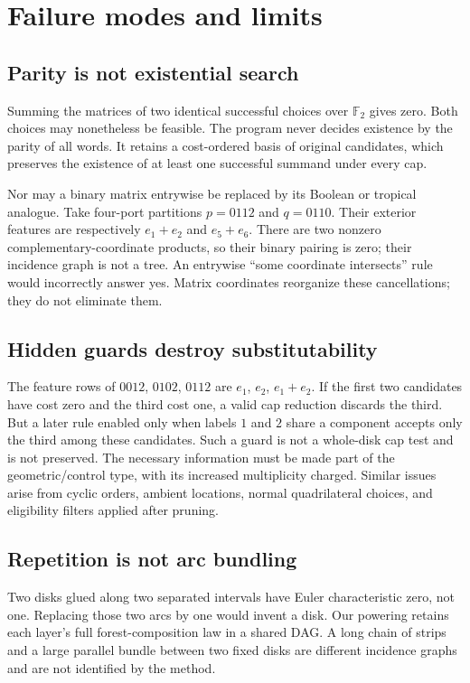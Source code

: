 \documentclass[11pt,a4paper]{article}
\theoremstyle{definition}
\newcommand{\F}{\mathbb F_2}
\begin{document}
\section{Failure modes and limits}\label{sec:limits}

\subsection{Parity is not existential search}
Summing the matrices of two identical successful choices over $\F$ gives zero. Both choices may nonetheless be feasible. The program never decides existence by the parity of all words. It retains a cost-ordered basis of original candidates, which preserves the existence of at least one successful summand under every cap.

Nor may a binary matrix entrywise be replaced by its Boolean or tropical analogue. Take four-port partitions $p=0112$ and $q=0110$. Their exterior features are respectively $e_1+e_2$ and $e_5+e_6$. There are two nonzero complementary-coordinate products, so their binary pairing is zero; their incidence graph is not a tree. An entrywise ``some coordinate intersects'' rule would incorrectly answer yes. Matrix coordinates reorganize these cancellations; they do not eliminate them.

\subsection{Hidden guards destroy substitutability}
The feature rows of $0012$, $0102$, $0112$ are $e_1$, $e_2$, $e_1+e_2$. If the first two candidates have cost zero and the third cost one, a valid cap reduction discards the third. But a later rule enabled only when labels $1$ and $2$ share a component accepts only the third among these candidates. Such a guard is not a whole-disk cap test and is not preserved. The necessary information must be made part of the geometric/control type, with its increased multiplicity charged. Similar issues arise from cyclic orders, ambient locations, normal quadrilateral choices, and eligibility filters applied after pruning.

\subsection{Repetition is not arc bundling}
Two disks glued along two separated intervals have Euler characteristic zero, not one. Replacing those two arcs by one would invent a disk. Our powering retains each layer's full forest-composition law in a shared DAG. A long chain of strips and a large parallel bundle between two fixed disks are different incidence graphs and are not identified by the method.
\end{document}

